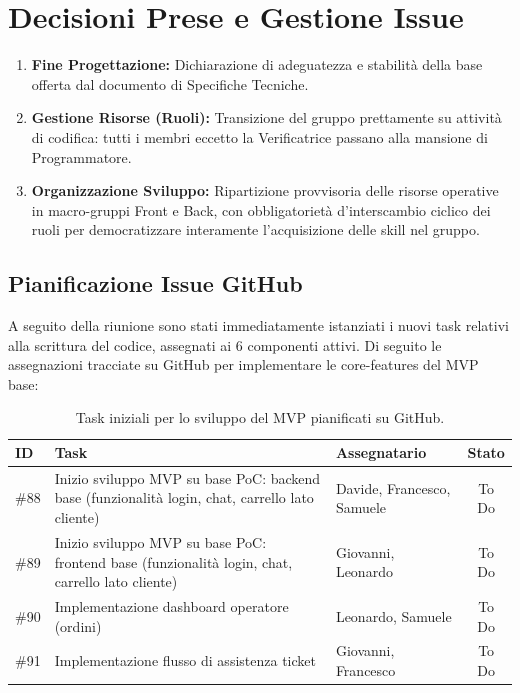 \documentclass[a4paper, 11pt, oneside]{scrartcl} %
\begin{document}
\newpage
\section{Decisioni Prese e Gestione Issue}

\begin{enumerate}
    \item \textbf{Fine Progettazione:} Dichiarazione di adeguatezza e stabilità della base offerta dal documento di Specifiche Tecniche.
    \item \textbf{Gestione Risorse (Ruoli):} Transizione del gruppo prettamente su attività di codifica: tutti i membri eccetto la Verificatrice passano alla mansione di Programmatore.
    \item \textbf{Organizzazione Sviluppo:} Ripartizione provvisoria delle risorse operative in macro-gruppi Front e Back, con obbligatorietà d'interscambio ciclico dei ruoli per democratizzare interamente l'acquisizione delle skill nel gruppo.
\end{enumerate}

\subsection{Pianificazione Issue GitHub}
A seguito della riunione sono stati immediatamente istanziati i nuovi task relativi alla scrittura del codice, assegnati ai 6 componenti attivi. Di seguito le assegnazioni tracciate su GitHub per implementare le core-features del MVP base:

\begin{table}[h!]
\centering
\small 
\begin{tabularx}{\textwidth}{@{}l X l c@{}} 
\toprule
\textbf{ID} & \textbf{Task} & \textbf{Assegnatario} & \textbf{Stato} \\
\midrule
\#88 & Inizio sviluppo MVP su base PoC: backend base (funzionalità login, chat, carrello lato cliente) & Davide, Francesco, Samuele & To Do \\
\addlinespace
\#89 & Inizio sviluppo MVP su base PoC: frontend base (funzionalità login, chat, carrello lato cliente) & Giovanni, Leonardo & To Do \\
\addlinespace
\#90 & Implementazione dashboard operatore (ordini) & Leonardo, Samuele & To Do \\
\addlinespace
\#91 & Implementazione flusso di assistenza ticket & Giovanni, Francesco & To Do \\
\bottomrule
\end{tabularx}
\caption{Task iniziali per lo sviluppo del MVP pianificati su GitHub.}
\end{table}

\newpage
\end{document}
